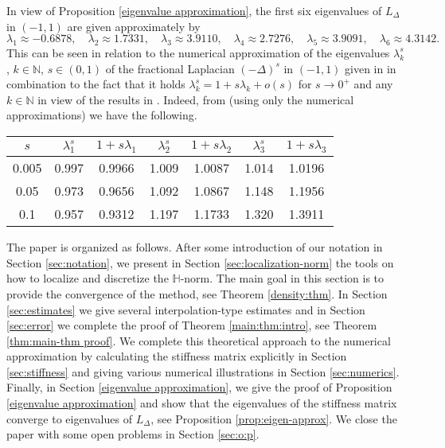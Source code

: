 \documentclass[10 pt]{article}
\numberwithin{equation}{section}
\def\N{\mathbb{N}}
\newcommand{\SJ}[1]{{\color{ForestGreen} #1}}  %
\begin{document}
{In view of Proposition \ref{eigenvalue approximation}, the first six eigenvalues of $L_{\Delta}$ in $(-1,1)$ are given approximately by
\begin{equation*}
\lambda_1\approx -0.6878, \quad \lambda_2\approx 1.7331,\quad \lambda_3\approx 3.9110,\quad \lambda_4\approx 2.7276, \quad \lambda_5\approx 3.9091,\quad \lambda_6\approx 4.3142.
\end{equation*}
This can be seen in relation to the numerical approximation of the eigenvalues $\lambda_{k}^s$, $k\in\N$, $s\in(0,1)$ of the fractional Laplacian $(-\Delta)^s$ in $(-1,1)$ given in \cite{K12} in combination to the fact that it holds $\lambda_k^s=1+s\lambda_k+o(s)$ for $s\to 0^+$ and any $k\in\N$ in view of the results in \cite{FJW22}. Indeed, from \cite[Table 1]{K12} (using only the numerical approximations) we have the following.
\begin{center}
\begin{tabular}{c|cc|cc|cc}
$s$ & $\lambda_1^s$ &$1+s\lambda_1$  & $\lambda_2^s$ &$1+s\lambda_2$ & $\lambda_3^s$ &$1+s\lambda_3$\\
\hline
0.005 & 0.997 & 0.9966 & 1.009 & 1.0087 & 1.014 & 1.0196\\
0.05  & 0.973 & 0.9656 & 1.092 & 1.0867 & 1.148 & 1.1956\\
0.1   & 0.957 & 0.9312 & 1.197 & 1.1733 & 1.320 & 1.3911
\end{tabular}
\end{center}
}


The paper is organized as follows.
\SJ{After some introduction of our notation in Section \ref{sec:notation}, we present in Section \ref{sec:localization-norm} the tools on how to localize and discretize the $\mathbb{H}$-norm. The main goal in this section is to provide the convergence of the method, see Theorem \ref{density:thm}. In Section \ref{sec:estimates} we give several interpolation-type estimates and in Section \ref{sec:error} we complete the proof of Theorem \ref{main:thm:intro}, see Theorem \ref{thm:main-thm proof}. We complete this theoretical approach to the numerical approximation by calculating the stiffness matrix explicitly in Section \ref{sec:stiffness} and giving various numerical illustrations in Section \ref{sec:numerics}. Finally, in Section \ref{eigenvalue approximation}, we give the proof of Proposition \ref{eigenvalue approximation} and show that the eigenvalues of the stiffness matrix converge to eigenvalues of $L_{\Delta}$, see Proposition \ref{prop:eigen-approx}. We close the paper with some open problems in Section \ref{sec:o:p}.
}
\end{document}
